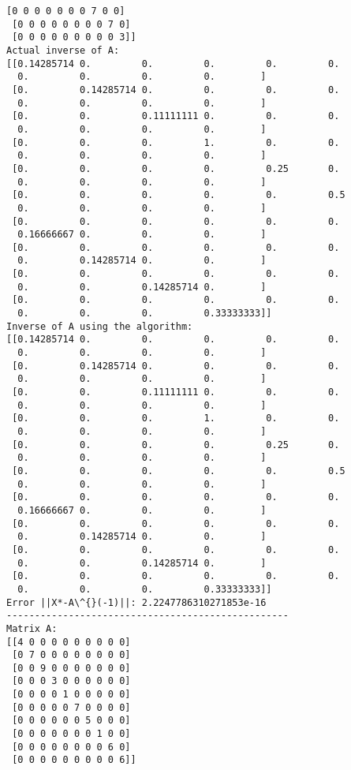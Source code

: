 \documentclass[11pt]{article}
\begin{document}
\begin{Verbatim}[commandchars=\\\{\}]
 [0 0 0 0 0 0 0 7 0 0]
 [0 0 0 0 0 0 0 0 7 0]
 [0 0 0 0 0 0 0 0 0 3]]
Actual inverse of A:
[[0.14285714 0.         0.         0.         0.         0.
  0.         0.         0.         0.        ]
 [0.         0.14285714 0.         0.         0.         0.
  0.         0.         0.         0.        ]
 [0.         0.         0.11111111 0.         0.         0.
  0.         0.         0.         0.        ]
 [0.         0.         0.         1.         0.         0.
  0.         0.         0.         0.        ]
 [0.         0.         0.         0.         0.25       0.
  0.         0.         0.         0.        ]
 [0.         0.         0.         0.         0.         0.5
  0.         0.         0.         0.        ]
 [0.         0.         0.         0.         0.         0.
  0.16666667 0.         0.         0.        ]
 [0.         0.         0.         0.         0.         0.
  0.         0.14285714 0.         0.        ]
 [0.         0.         0.         0.         0.         0.
  0.         0.         0.14285714 0.        ]
 [0.         0.         0.         0.         0.         0.
  0.         0.         0.         0.33333333]]
Inverse of A using the algorithm:
[[0.14285714 0.         0.         0.         0.         0.
  0.         0.         0.         0.        ]
 [0.         0.14285714 0.         0.         0.         0.
  0.         0.         0.         0.        ]
 [0.         0.         0.11111111 0.         0.         0.
  0.         0.         0.         0.        ]
 [0.         0.         0.         1.         0.         0.
  0.         0.         0.         0.        ]
 [0.         0.         0.         0.         0.25       0.
  0.         0.         0.         0.        ]
 [0.         0.         0.         0.         0.         0.5
  0.         0.         0.         0.        ]
 [0.         0.         0.         0.         0.         0.
  0.16666667 0.         0.         0.        ]
 [0.         0.         0.         0.         0.         0.
  0.         0.14285714 0.         0.        ]
 [0.         0.         0.         0.         0.         0.
  0.         0.         0.14285714 0.        ]
 [0.         0.         0.         0.         0.         0.
  0.         0.         0.         0.33333333]]
Error ||X*-A\^{}(-1)||: 2.2247786310271853e-16
--------------------------------------------------
Matrix A:
[[4 0 0 0 0 0 0 0 0 0]
 [0 7 0 0 0 0 0 0 0 0]
 [0 0 9 0 0 0 0 0 0 0]
 [0 0 0 3 0 0 0 0 0 0]
 [0 0 0 0 1 0 0 0 0 0]
 [0 0 0 0 0 7 0 0 0 0]
 [0 0 0 0 0 0 5 0 0 0]
 [0 0 0 0 0 0 0 1 0 0]
 [0 0 0 0 0 0 0 0 6 0]
 [0 0 0 0 0 0 0 0 0 6]]

\end{Verbatim}
\end{document}
